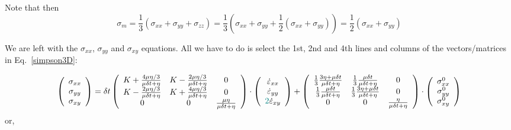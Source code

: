 Note that then
\[
\sigma_m 
= \frac{1}{3}(\sigma_{xx}+\sigma_{yy}+\sigma_{zz})
= \frac{1}{3}(\sigma_{xx}+\sigma_{yy}+\frac12(\sigma_{xx}+\sigma_{yy}))
= \frac{1}{2}(\sigma_{xx}+\sigma_{yy})
\]


We are left with the $\sigma_{xx}$, $\sigma_{yy}$ and $\sigma_{xy}$
equations. All we have to do is select the 1st, 2nd and 4th lines and 
columns of the vectors/matrices in Eq.~\eqref{simpson3D}:

\[
\left(
\begin{array}{c}
\sigma_{xx}\\ 
\sigma_{yy}\\ 
\sigma_{xy} 
\end{array}
\right)
=
\delta t
\left(
\begin{array}{ccc}
K + \frac{4\mu \eta/3}{\mu \delta t + \eta} &
K - \frac{2\mu \eta/3}{\mu \delta t + \eta} &
0 \\
K - \frac{2\mu \eta/3}{\mu \delta t + \eta} &
K + \frac{4\mu \eta/3}{\mu \delta t + \eta} &
0  \\
0 & 0 & \frac{\mu \eta }{\mu \delta t + \eta}  \\
\end{array}
\right)
\cdot
\left(
\begin{array}{c}
\dot\varepsilon_{xx}\\ 
\dot\varepsilon_{yy}\\ 
{\color{teal}2}\dot\varepsilon_{xy} 
\end{array}
\right) 
+
\left(
\begin{array}{cccccc}
\frac13\frac{3\eta + \mu \delta t}{\mu\delta t+\eta} & 
\frac13\frac{\mu \delta t}{\mu\delta t+\eta} & 
0\\
\frac13\frac{\mu \delta t}{\mu\delta t+\eta} & 
\frac13\frac{3\eta + \mu \delta t}{\mu\delta t+\eta} & 
0\\
0 & 0 & \frac{ \eta}{\mu\delta t + \eta}  
\end{array}
\right)
\cdot
\left(
\begin{array}{c}
\sigma_{xx}^0\\ 
\sigma_{yy}^0\\ 
\sigma_{xy}^0 
\end{array}
\right) 
\]
or,
